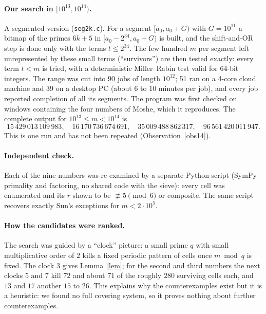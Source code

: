 \documentclass[11pt,a4paper]{article}
\theoremstyle{definition}\newtheorem{definition}[theorem]{Definition}
\theoremstyle{remark}\newtheorem{remark}[theorem]{Remark}
\begin{document}
\paragraph{Our search in $[10^{13},10^{14})$.} A segmented version (\texttt{seg2k.c}). For a segment $[a_0,a_0+G)$
with $G=10^{11}$ a bitmap of the primes $6k+5$ in $[a_0-2^{34},a_0+G)$ is built, and the shift-and-OR step is done
only with the terms $t\le 2^{34}$. The few hundred $m$ per segment left unrepresented by these small terms
(``survivors'') are then tested exactly: every term $t<m$ is tried, with a deterministic Miller--Rabin test valid
for 64-bit integers. The range was cut into 90 jobs of length $10^{12}$; 51 ran on a 4-core cloud machine and 39
on a desktop PC (about 6 to 10 minutes per job), and every job reported completion of all its segments. The program
was first checked on windows containing the four numbers of Moshe, which it reproduces. The complete output for
$10^{13}\le m<10^{14}$ is
\[15\,429\,013\,109\,983,\quad 16\,170\,736\,674\,691,\quad 35\,009\,488\,862\,317,\quad 96\,561\,420\,011\,947 .\]
This is one run and has not been repeated (Observation~\ref{obs14}).
\paragraph{Independent check.} Each of the nine numbers was re-examined by a separate Python script (SymPy
primality and factoring, no shared code with the sieve): every cell was enumerated and its $r$ shown to be
$\not\equiv 5\pmod 6$ or composite. The same script recovers exactly Sun's exceptions for $m<2\cdot10^{5}$.
\paragraph{How the candidates were ranked.} The search was guided by a ``clock'' picture: a small prime $q$ with
small multiplicative order of $2$ kills a fixed periodic pattern of cells once $m \bmod q$ is fixed. The clock $3$
gives Lemma~\ref{lem}; for the second and third numbers the next clocks $5$ and $7$ kill $72$ and about $71$ of the roughly $280$
surviving cells each, and $13$ and $17$ another $15$ to $26$. This explains why the counterexamples exist but it is
a heuristic: we found no full covering system, so it proves nothing about
further counterexamples.
\end{document}

